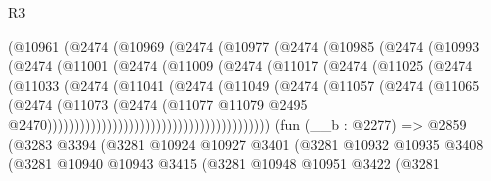 \begin{lexlean}{R3}
\begin{coremodule}
                        (@10961
                          (@2474
                            (@10969
                              (@2474
                                (@10977
                                  (@2474
                                    (@10985
                                      (@2474
                                        (@10993
                                          (@2474
                                            (@11001
                                              (@2474
                                                (@11009
                                                  (@2474
                                                    (@11017
                                                      (@2474
                                                        (@11025
                                                          (@2474
                                                            (@11033
                                                              (@2474
                                                                (@11041
                                                                  (@2474
                                                                    (@11049
                                                                      (@2474
                                                                        (@11057
                                                                          (@2474
                                                                            (@11065
                                                                              (@2474
                                                                                (@11073
                                                                                  (@2474
                                                                                    (@11077
                                                                                      @11079
                                                                                      @2495
                                                                                      @2470)))))))))))))))))))))))))))))))))))))))))
    (fun (__b : @2277) =>
    @2859
      (@3283
        @3394
        (@3281
          @10924
          @10927
          @3401
          (@3281
            @10932
            @10935
            @3408
            (@3281
              @10940
              @10943
              @3415
              (@3281
                @10948
                @10951
                @3422
                (@3281

\end{coremodule}
\end{lexlean}
